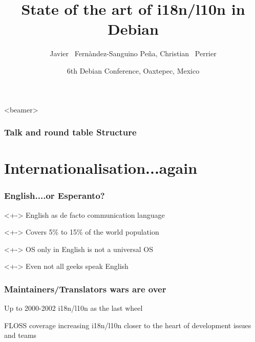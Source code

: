 \documentclass{beamer}
\title[State of the art of i18n/l10n in Debian] 
{State of the art of i18n/l10n in Debian}
\author[jfs, bubulle] 
{Javier ~Fernàndez-Sanguino Peña, Christian ~Perrier}
\date[Debconf 6] 
{6th Debian Conference, Oaxtepec, Mexico}
\begin{document}
\frame{\titlepage}

\begin{frame}<beamer>
    \frametitle{Talk and round table Structure}
    \tableofcontents[subsectionstyle=hide]
\end{frame}

\section{Internationalisation...again}


\begin{frame}
  \frametitle{English....or Esperanto?}
	\begin{block}<+->
		{English as de facto communication language}
	\end{block}
	\begin{block}<+->
		{Covers 5\% to 15\% of the world population}
	\end{block}
	\begin{block}<+->
		{OS only in English is not a universal OS}
	\end{block}
	\begin{block}<+->
		{Even not all geeks speak English}
	\end{block}
\end{frame}

\begin{frame}
  \frametitle{Maintainers/Translators wars are over}
	\begin{block}
		{Up to 2000-2002}
		i18n/l10n as the last wheel
	\end{block}
	\begin{block}
		{FLOSS coverage increasing}
		i18n/l10n closer to the heart of development issues and teams
	\end{block}
\end{frame}
\end{document}
